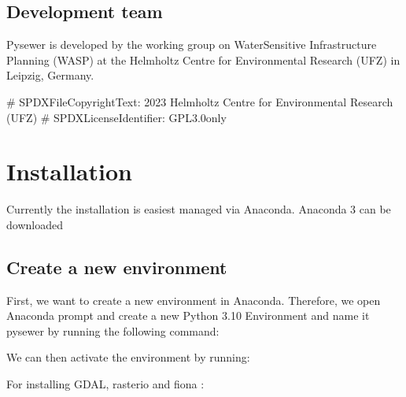 \documentclass[letterpaper,10pt,english]{sphinxmanual}
\begin{document}
\section{Development team}
\label{\detokenize{about:development-team}}
\sphinxAtStartPar
Pysewer is developed by the working group on Water\sphinxhyphen{}Sensitive Infrastructure Planning (WASP) at the Helmholtz Centre for Environmental Research (UFZ) in Leipzig, Germany.

\sphinxstepscope

\sphinxAtStartPar
\# SPDX\sphinxhyphen{}FileCopyrightText: 2023 Helmholtz Centre for Environmental Research (UFZ)
\# SPDX\sphinxhyphen{}License\sphinxhyphen{}Identifier: GPL\sphinxhyphen{}3.0\sphinxhyphen{}only


\chapter{Installation}
\label{\detokenize{install:installation}}\label{\detokenize{install::doc}}
\sphinxAtStartPar
Currently the installation is easiest managed via Anaconda. Anaconda 3 can be downloaded 


\section{Create a new environment}
\label{\detokenize{install:create-a-new-environment}}
\sphinxAtStartPar
First, we want to create a new environment in Anaconda. Therefore, we open Anaconda prompt and create a new Python 3.10 Environment and name it pysewer by running the following command:

\begin{sphinxVerbatim}[commandchars=\\\{\}]
    
\end{sphinxVerbatim}

\sphinxAtStartPar
We can then activate the environment by running:

\begin{sphinxVerbatim}[commandchars=\\\{\}]
  
\end{sphinxVerbatim}

\sphinxAtStartPar
For installing GDAL, rasterio and fiona :

\begin{sphinxVerbatim}[commandchars=\\\{\}]
      
\end{sphinxVerbatim}
\end{document}
